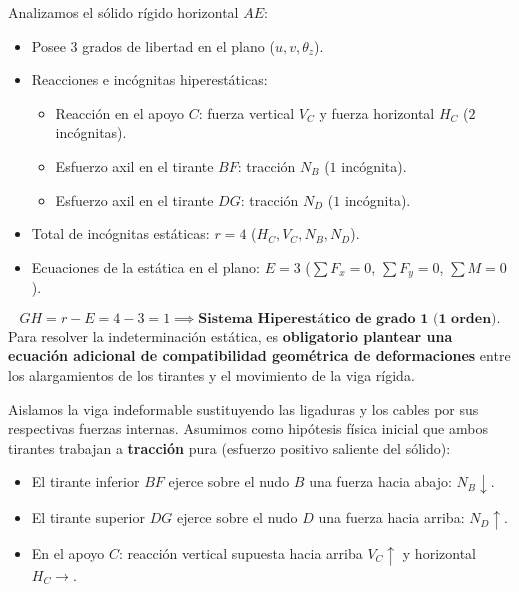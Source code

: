
Analizamos el sólido rígido horizontal $AE$:
\begin{itemize}
    \item Posee $3$ grados de libertad en el plano ($u, v, \theta_z$).
    \item Reacciones e incógnitas hiperestáticas:
          \begin{itemize}
              \item Reacción en el apoyo $C$: fuerza vertical $V_C$ y fuerza horizontal $H_C$ ($2$ incógnitas).
              \item Esfuerzo axil en el tirante $BF$: tracción $N_B$ ($1$ incógnita).
              \item Esfuerzo axil en el tirante $DG$: tracción $N_D$ ($1$ incógnita).
          \end{itemize}
    \item Total de incógnitas estáticas: $r = 4$ ($H_C, V_C, N_B, N_D$).
    \item Ecuaciones de la estática en el plano: $E = 3$ ($\sum F_x = 0$, $\sum F_y = 0$, $\sum M = 0$).
\end{itemize}
\begin{equation}
    GH = r - E = 4 - 3 = 1 \implies \textbf{Sistema Hiperestático de grado 1 (1 orden).}
\end{equation}
Para resolver la indeterminación estática, es \textbf{obligatorio plantear una ecuación adicional de compatibilidad geométrica de deformaciones} entre los alargamientos de los tirantes y el movimiento de la viga rígida.


Aislamos la viga indeformable sustituyendo las ligaduras y los cables por sus respectivas fuerzas internas. Asumimos como hipótesis física inicial que ambos tirantes trabajan a \textbf{tracción} pura (esfuerzo positivo saliente del sólido):
\begin{itemize}
    \item El tirante inferior $BF$ ejerce sobre el nudo $B$ una fuerza hacia abajo: $N_B \downarrow$.
    \item El tirante superior $DG$ ejerce sobre el nudo $D$ una fuerza hacia arriba: $N_D \uparrow$.
    \item En el apoyo $C$: reacción vertical supuesta hacia arriba $V_C \uparrow$ y horizontal $H_C \rightarrow$.
\end{itemize}

